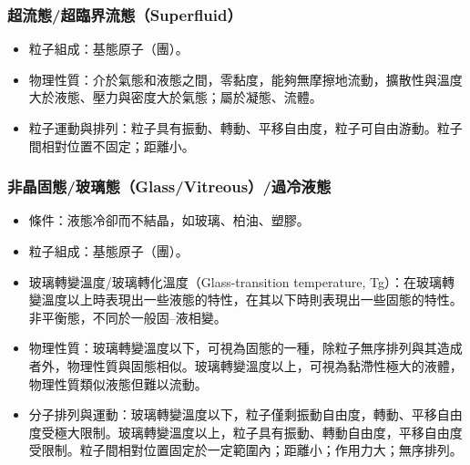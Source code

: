 \documentclass[a4paper,12pt]{report}
\begin{document}
\subsubsection{超流態/超臨界流態（Superfluid）}
\begin{itemize}
\item 粒子組成：基態原子（團）。
\item 物理性質：介於氣態和液態之間，零黏度，能夠無摩擦地流動，擴散性與溫度大於液態、壓力與密度大於氣態；屬於凝態、流體。
\item 粒子運動與排列：粒子具有振動、轉動、平移自由度，粒子可自由游動。粒子間相對位置不固定；距離小。
\end{itemize}
\subsubsection{非晶固態/玻璃態（Glass/Vitreous）/過冷液態}
\begin{itemize}
\item 條件：液態冷卻而不結晶，如玻璃、柏油、塑膠。
\item 粒子組成：基態原子（團）。
\item 玻璃轉變溫度/玻璃轉化溫度（Glass-transition temperature, Tg）：在玻璃轉變溫度以上時表現出一些液態的特性，在其以下時則表現出一些固態的特性。非平衡態，不同於一般固–液相變。
\item 物理性質：玻璃轉變溫度以下，可視為固態的一種，除粒子無序排列與其造成者外，物理性質與固態相似。玻璃轉變溫度以上，可視為黏滯性極大的液體，物理性質類似液態但難以流動。
\item 分子排列與運動：玻璃轉變溫度以下，粒子僅剩振動自由度，轉動、平移自由度受極大限制。玻璃轉變溫度以上，粒子具有振動、轉動自由度，平移自由度受限制。粒子間相對位置固定於一定範圍內；距離小；作用力大；無序排列。
\end{itemize}
\end{document}

